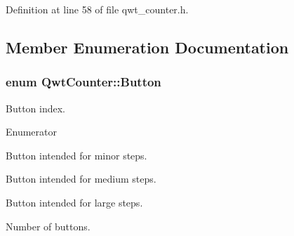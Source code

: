 Definition at line 58 of file qwt\-\_\-counter.\-h.



\subsection{Member Enumeration Documentation}
\hypertarget{class_qwt_counter_a027cfd91946ca9a19a1d606411e0f374}{
\subsubsection[{Button}]{\setlength{\rightskip}{0pt plus 5cm}enum {\bf Qwt\-Counter\-::\-Button}}}\label{class_qwt_counter_a027cfd91946ca9a19a1d606411e0f374}


Button index. 

\begin{Desc}
\item[Enumerator]\par
\begin{description}
\item[{\em 
\hypertarget{class_qwt_counter_a027cfd91946ca9a19a1d606411e0f374a1b29fe43c7d59986eb5854ddaf6f7179}{Button1}\label{class_qwt_counter_a027cfd91946ca9a19a1d606411e0f374a1b29fe43c7d59986eb5854ddaf6f7179}
}]Button intended for minor steps. \item[{\em 
\hypertarget{class_qwt_counter_a027cfd91946ca9a19a1d606411e0f374a6015e556fcb8c4d45126dee5435b478d}{Button2}\label{class_qwt_counter_a027cfd91946ca9a19a1d606411e0f374a6015e556fcb8c4d45126dee5435b478d}
}]Button intended for medium steps. \item[{\em 
\hypertarget{class_qwt_counter_a027cfd91946ca9a19a1d606411e0f374a30b64d40b31283807f1a4f3d57af0e74}{Button3}\label{class_qwt_counter_a027cfd91946ca9a19a1d606411e0f374a30b64d40b31283807f1a4f3d57af0e74}
}]Button intended for large steps. \item[{\em 
\hypertarget{class_qwt_counter_a027cfd91946ca9a19a1d606411e0f374aca8e93a2d129f7cc91f54f5f4da20c5f}{Button\-Cnt}\label{class_qwt_counter_a027cfd91946ca9a19a1d606411e0f374aca8e93a2d129f7cc91f54f5f4da20c5f}
}]Number of buttons. \end{description}
\end{Desc}


